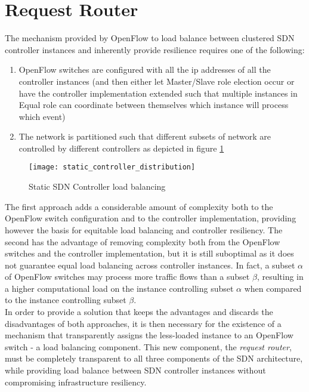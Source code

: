 \section{Request Router}
\label{section:request-router}
The mechanism provided by OpenFlow to load balance between clustered \gls{SDN} controller instances and inherently provide resilience requires one of the following:
\begin{enumerate}
	\item OpenFlow switches are configured with all the ip addresses of all the controller instances (and then either let Master/Slave role election occur or have the controller implementation extended such that multiple instances in Equal role can coordinate between themselves which instance will process which event)
	\item The network is partitioned such that different subsets of network are controlled by different controllers as depicted in figure \ref{fig:static_controller_distribution}
\end{enumerate}
%
\begin{figure}
	\centering
	\texttt{[image: static\_controller\_distribution]}
	\caption{Static SDN Controller load balancing}
	\label{fig:static_controller_distribution}
\end{figure}
%
The first approach adds a considerable amount of complexity both to the OpenFlow switch configuration and to the controller implementation, providing however the basis for equitable load balancing and controller resiliency.
The second has the advantage of removing complexity both from the OpenFlow switches and the controller implementation, but it is still suboptimal as it does not guarantee equal load balancing across controller instances. In fact, a subset $\alpha$ of OpenFlow switches may process more traffic flows than a subset $\beta$, resulting in a higher computational load on the instance controlling subset $\alpha$ when compared to the instance controlling subset $\beta$.\\
%
In order to provide a solution that keeps the advantages and discards the disadvantages of both approaches, it is then necessary for the existence of a mechanism that transparently assigns the less-loaded instance to an OpenFlow switch - a load balancing component.
This new component, the \emph{request router}, must be completely transparent to all three components of the \gls{SDN} architecture, while providing load balance between \gls{SDN} controller instances without compromising infrastructure resiliency.\\
